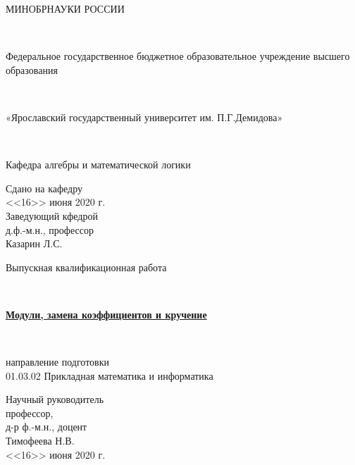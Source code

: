 
\begin{titlepage}
\parindent=1.25cm

	\begin{center}
		{\large МИНОБРНАУКИ РОССИИ
			
		~
		
		Федеральное государственное бюджетное образовательное учреждение высшего образования		
		
		~
		
		«Ярославский государственный университет им. П.Г.Демидова»
		
		~
		
		Кафедра алгебры и математической логики}
		\vfill
		\newlength{\ML}
		\hfill\begin{minipage}{0.45\textwidth}
			\begin{flushright}
				Сдано на кафедру\\ 
				<<16>> июня 2020 г.\\
				Заведующий кфедрой \\
				д.ф.-м.н., профессор\\
				\underline{\hspace{3cm}} Казарин Л.С.\\
			\end{flushright}
		\end{minipage}%
		\vfill
		
		{\large Выпускная квалификационная работа}
		
		~
		
		\underline{\textbf{{\large Модули, замена коэффициентов и кручение}}}

		~

		\large{направление подготовки  \\
		01.03.02 Прикладная математика и информатика}

	\end{center}
	\vfill
	
	
	\settowidth{\ML}{«\underline{\hspace{0.7cm}}» \underline{\hspace{2cm}}}
	\hfill\begin{minipage}{0.45\textwidth}
		\begin{flushright}
			Научный руководитель\\
			профессор, \\
			д-р ф.-м.н., доцент\\
			\underline{\hspace{3cm}} Тимофеева Н.В.\\
			<<16>> июня 2020 г.
		\end{flushright}
		

\end{minipage}
\end{titlepage}
